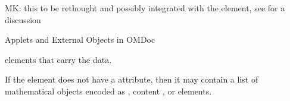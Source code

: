 \begin{module}[id=ext]
\begin{omgroup}[id=ext,short=Auxiliary Elements]
\begin{oldpart}{MK: this to be rethought and possibly integrated with the
     element, see  for a discussion}
\begin{omgroup}[id=applets]{Applets and External Objects in OMDoc}
\begin{definition}[id=parameter.def]
\begin{description}
   elements that carry the data.
\end{description}
If the  element does not have a  attribute,
then it may contain a list of mathematical objects encoded as {\openmath}, content
{\mathml}, or  elements.
\end{definition}
\end{omgroup}
\end{oldpart}
\end{omgroup}
\end{module}


